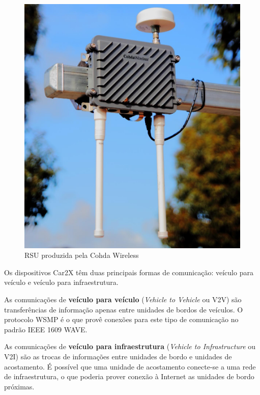 \documentclass[
12pt,				%
openright,			%
oneside,			%
a4paper,			%
brazil,				%
]{abntex2}
\begin{document}
	\begin{figure} [H]
		\centering
		\includegraphics[scale=.45]{figuras/waveDevices/CohdaRSU}
		\caption{\label{RSU_Cohda}RSU produzida pela Cohda Wireless}
	\end{figure}
	
	\par Os dispositivos Car2X têm duas principais formas de comunicação: veículo para veículo e veículo para infraestrutura.
	
	\par As comunicações de \textbf{veículo para veículo} (\textit{Vehicle to Vehicle} ou V2V) são transferências de informação apenas entre unidades de bordos de veículos. O protocolo WSMP é o que provê conexões para este tipo de comunicação no padrão IEEE 1609 WAVE.
		
	\par As comunicações de \textbf{veículo para infraestrutura} (\textit{Vehicle to Infrastructure} ou V2I) são as trocas de informações entre unidades de bordo e unidades de acostamento. É possível que uma unidade de acostamento conecte-se a uma rede de infraestrutura, o que poderia prover conexão à Internet as unidades de bordo próximas.
	
\end{document}
